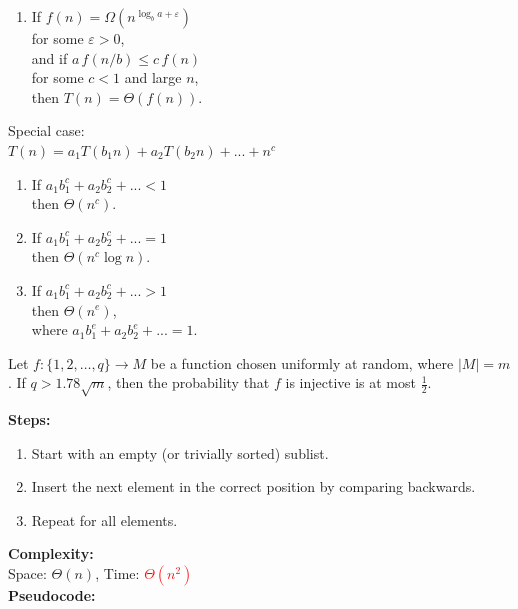 \documentclass[a4paper,landscape]{article}
\newcommand{\timecomplexity}[1]{\textcolor{red}{#1}}
\begin{document}
\begin{multicols}{7}
\begin{enumerate}[noitemsep, topsep=0pt]
    \item If \( f(n) = \Omega(n^{\log_b a + \varepsilon}) \) \\ for some \( \varepsilon > 0 \),\\
          and if \( a\,f(n/b) \leq c\,f(n) \) \\ for some \( c < 1 \) and large \( n \),\\
          then \( T(n) = \Theta(f(n)) \).
\end{enumerate}
\tcblower
Special case:\\
\(T(n) = a_1T(b_1n) + a_2T(b_2n) + ... + n^c\)
\begin{enumerate}[noitemsep, topsep=0pt]
    \item If \(a_1b_1^c + a_2b_2^c + ...  < 1 \) \\ \hspace*{2mm} then \( \Theta(n^c)\).
    \item If \(a_1b_1^c + a_2b_2^c + ...  = 1\) \\ \hspace*{2mm} then \( \Theta(n^c \log n)\).
    \item If \(a_1b_1^c + a_2b_2^c + ...  > 1 \) \\ \hspace*{2mm} then \( \Theta(n^e)\), \\ \hspace*{2mm} where \(a_1b_1^e + a_2b_2^e + ... = 1\).
\end{enumerate}
\endtcolorbox

\tcolorbox[mybox={Injective Functions}] 
Let $f : \{1, 2, \dots, q\} \to M$ be a function chosen uniformly at random, where $|M| = m$.  
If $q > 1.78\sqrt{m}$, then the probability that $f$ is injective is at most $\frac{1}{2}$.
\endtcolorbox

\tcolorbox[mybox={Insertion Sort}]
\textbf{Steps:}
\begin{enumerate}[noitemsep, topsep=0pt]
    \item Start with an empty (or trivially sorted) sublist.
    \item Insert the next element in the correct position by comparing backwards.
    \item Repeat for all elements.
\end{enumerate}
\textbf{Complexity:}\\
Space: \( \Theta(n) \), Time: \timecomplexity{\( \Theta(n^2) \)}\\
\textbf{Pseudocode:}
\noindent %
\endtcolorbox


\end{multicols}
\end{document}
